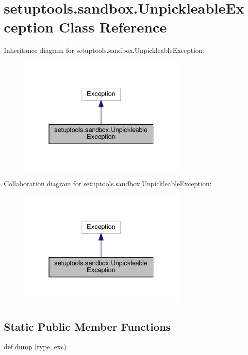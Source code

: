 \hypertarget{classsetuptools_1_1sandbox_1_1UnpickleableException}{}\section{setuptools.\+sandbox.\+Unpickleable\+Exception Class Reference}
\label{classsetuptools_1_1sandbox_1_1UnpickleableException}


Inheritance diagram for setuptools.\+sandbox.\+Unpickleable\+Exception\+:
\nopagebreak
\begin{figure}[H]
\begin{center}
\leavevmode
\includegraphics[width=241pt]{classsetuptools_1_1sandbox_1_1UnpickleableException__inherit__graph}
\end{center}
\end{figure}


Collaboration diagram for setuptools.\+sandbox.\+Unpickleable\+Exception\+:
\nopagebreak
\begin{figure}[H]
\begin{center}
\leavevmode
\includegraphics[width=241pt]{classsetuptools_1_1sandbox_1_1UnpickleableException__coll__graph}
\end{center}
\end{figure}
\subsection*{Static Public Member Functions}
\begin{DoxyCompactItemize}
\item 
def \hyperlink{classsetuptools_1_1sandbox_1_1UnpickleableException_af422ad487e1865fe760f193c6e63960c}{dump} (type, exc)
\end{DoxyCompactItemize}


